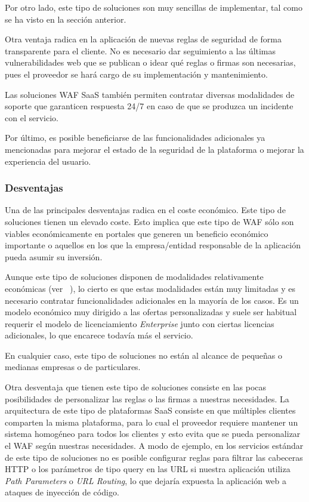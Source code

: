 \par Por otro lado, este tipo de soluciones son muy sencillas de implementar, tal como se ha visto en la sección anterior.
\par Otra ventaja radica en la aplicación de nuevas reglas de seguridad de forma transparente para el cliente. No es necesario dar seguimiento
a las últimas vulnerabilidades web que se publican o idear qué reglas o firmas son necesarias, pues el proveedor se hará cargo de su
implementación y mantenimiento.
\par Las soluciones WAF SaaS también permiten contratar diversas modalidades de soporte que garanticen respuesta 24/7 en caso de que se
produzca un incidente con el servicio.
\par Por último, es posible beneficiarse de las funcionalidades adicionales ya mencionadas para mejorar el estado de la seguridad de la plataforma o mejorar la experiencia del usuario.


\subsubsection{Desventajas}
\par Una de las principales desventajas radica en el coste económico. Este tipo de soluciones tienen un elevado coste. Esto implica que este tipo de WAF sólo son viables económicamente en portales que generen un beneficio económico importante o aquellos en los que la empresa/entidad responsable de la aplicación pueda asumir su inversión.
\par Aunque este tipo de soluciones disponen de modalidades relativamente económicas (ver ~), lo cierto es que estas modalidades
están muy limitadas y es necesario contratar funcionalidades adicionales en la mayoría de los casos. Es un modelo económico muy dirigido a las
ofertas personalizadas y suele ser habitual requerir el modelo de licenciamiento {\em Enterprise} junto con ciertas licencias adicionales, lo que encarece todavía más el servicio.
\par En cualquier caso, este tipo de soluciones no están al alcance de pequeñas o medianas empresas o de particulares.

\par Otra desventaja que tienen este tipo de soluciones consiste en las pocas posibilidades de personalizar las reglas o las firmas
a nuestras necesidades. La arquitectura de este tipo de plataformas SaaS consiste en que múltiples clientes comparten la misma plataforma, para
lo cual el proveedor requiere mantener un sistema homogéneo para todos los clientes y esto evita que se pueda personalizar el WAF según
nuestras necesidades. A modo de ejemplo, en los servicios estándar de este tipo de soluciones no es posible configurar reglas para filtrar las
cabeceras HTTP o los parámetros de tipo query en las URL si nuestra aplicación utiliza {\em Path Parameters} o {\em URL Routing}, lo que
dejaría expuesta la aplicación web a ataques de inyección de código.


